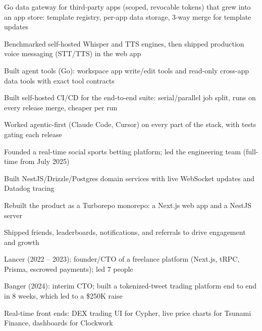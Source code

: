 \documentclass[print]{jack-resume}
\begin{document}
\begin{tightemize}
    \item Go data gateway for third-party apps (scoped, revocable tokens) that grew into an app store: template registry, per-app data storage, 3-way merge for template updates
    \item Benchmarked self-hosted Whisper and TTS engines, then shipped production voice messaging (STT/TTS) in the web app
    \item Built agent tools (Go): workspace app write/edit tools and read-only cross-app data tools with exact tool contracts
    \item Built self-hosted CI/CD for the end-to-end suite: serial/parallel job split, runs on every release merge, cheaper per run
    \item Worked agentic-first (Claude Code, Cursor) on every part of the stack, with tests gating each release
\end{tightemize}
\sectionsep

\begin{tightemize}
    \item Founded a real-time social sports betting platform; led the engineering team (full-time from July 2025)
    \item Built NestJS/Drizzle/Postgres domain services with live WebSocket updates and Datadog tracing
    \item Rebuilt the product as a Turborepo monorepo: a Next.js web app and a NestJS server
    \item Shipped friends, leaderboards, notifications, and referrals to drive engagement and growth
\end{tightemize}
\sectionsep

\begin{tightemize}
    \item Lancer (2022 -- 2023): founder/CTO of a freelance platform (Next.js, tRPC, Prisma, escrowed payments); led 7 people
    \item Banger (2024): interim CTO; built a tokenized-tweet trading platform end to end in 8 weeks, which led to a \$250K raise
    \item Real-time front ends: DEX trading UI for Cypher, live price charts for Tsunami Finance, dashboards for Clockwork
\end{tightemize}
\sectionsep
\end{document}
